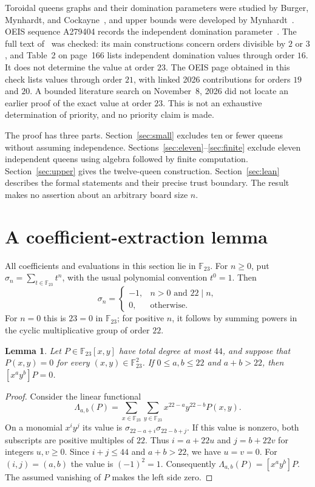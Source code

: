 \documentclass[11pt,a4paper]{article}
\newtheorem{lemma}[theorem]{Lemma}
\theoremstyle{remark}
\newcommand{\F}{\mathbb F_{23}}
\newcommand{\coeff}[2]{[#1]#2}
\begin{document}
Toroidal queens graphs and their domination parameters were studied by
Burger, Mynhardt, and Cockayne~\cite{BMC2001}, and upper bounds were developed by
Mynhardt~\cite{Mynhardt2003}. OEIS sequence A279404 records the independent
domination parameter~\cite{OEIS}. The full text of~\cite{Mynhardt2003} was
checked: its main constructions concern orders divisible by $2$ or $3$, and
Table~2 on page~166 lists independent domination values through order $16$.
It does not determine the value at order $23$. The OEIS page obtained in this
check lists values through order $21$, with linked 2026 contributions for
orders $19$ and $20$. A bounded literature search on November~8, 2026 did not
locate an earlier proof of the exact value at order $23$. This is not an
exhaustive determination of priority, and no priority claim is made.

The proof has three parts. Section~\ref{sec:small} excludes ten or fewer queens
without assuming independence. Sections~\ref{sec:eleven}--\ref{sec:finite}
exclude eleven independent queens using algebra followed by finite computation.
Section~\ref{sec:upper} gives the twelve-queen construction.
Section~\ref{sec:lean} describes the formal statements and their precise trust
boundary. The result makes no assertion about an arbitrary board size $n$.

\section{A coefficient-extraction lemma}\label{sec:grid}
All coefficients and evaluations in this section lie in $\F$. For $n\geq0$,
put $\sigma_n=\sum_{t\in\F}t^n$, with the usual polynomial convention $t^0=1$.
Then
\begin{equation}\label{eq:powersums}
 \sigma_n=
 \begin{cases}
 -1,&n>0\text{ and }22\mid n,\\
 0,&\text{otherwise}.
 \end{cases}
\end{equation}
For $n=0$ this is $23=0$ in $\F$; for positive $n$, it follows by summing
powers in the cyclic multiplicative group of order $22$.

\begin{lemma}\label{lem:grid}
Let $P\in\F[x,y]$ have total degree at most $44$, and suppose that
$P(x,y)=0$ for every $(x,y)\in\F^2$. If $0\leq a,b\leq22$ and $a+b>22$, then
$\coeff{x^ay^b}{P}=0$.
\end{lemma}
\begin{proof}
Consider the linear functional
\[
 \Lambda_{a,b}(P)=\sum_{x\in\F}\sum_{y\in\F}
       x^{22-a}y^{22-b}P(x,y).
\]
On a monomial $x^iy^j$ its value is
$\sigma_{22-a+i}\sigma_{22-b+j}$. If this value is nonzero, both subscripts
are positive multiples of $22$. Thus $i=a+22u$ and $j=b+22v$ for integers
$u,v\geq0$. Since $i+j\leq44$ and $a+b>22$, we have $u=v=0$.
For $(i,j)=(a,b)$ the value is $(-1)^2=1$.
Consequently $\Lambda_{a,b}(P)=\coeff{x^ay^b}{P}$.
The assumed vanishing of $P$ makes the left side zero.
\end{proof}
\end{document}
